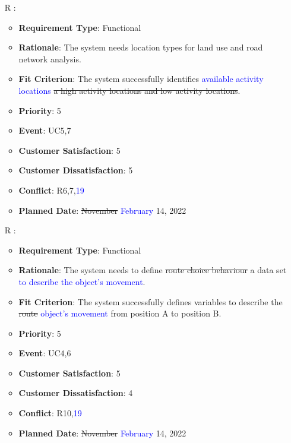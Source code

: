 \documentclass[12pt, titlepage]{article}
\newcounter{reqnum} %
\begin{document}
\begin{itemize}
\item[R\refstepcounter{reqnum}\thereqnum
\label{R_Inputs_1}:] 
\begin{itemize}
    \item \textbf{Requirement Type}: Functional
    \item \textbf{Rationale}: The system needs location types for land use and road network analysis.
    \item \textbf{Fit Criterion}: The system successfully identifies \textcolor{blue}{available activity locations} \sout{a high activity locations and low activity locations}. 
    \item \textbf{Priority}: 5
    \item \textbf{Event}: UC5,7
    \item \textbf{Customer Satisfaction}: 5
    \item \textbf{Customer Dissatisfaction}: 5
    \item \textbf{Conflict}: R6,7,\textcolor{blue}{19}
    \item \textbf{Planned Date}: \sout{November} \textcolor{blue}{February} 14, 2022
\end{itemize}

\item[R\refstepcounter{reqnum}\thereqnum
\label{R_Inputs_1}:] 
\begin{itemize}
    \item \textbf{Requirement Type}: Functional
    \item \textbf{Rationale}: The system needs to define \sout{route choice behaviour} a data set \textcolor{blue}{to describe the object's movement}.
    \item \textbf{Fit Criterion}: The system successfully defines variables to describe the \sout{route} \textcolor{blue}{object's movement} from position A to position B.
    \item \textbf{Priority}: 5
    \item \textbf{Event}: UC4,6
    \item \textbf{Customer Satisfaction}: 5
    \item \textbf{Customer Dissatisfaction}: 4
    \item \textbf{Conflict}: R10,\textcolor{blue}{19}
    \item \textbf{Planned Date}: \sout{November} \textcolor{blue}{February} 14, 2022
\end{itemize}



\end{itemize}
\end{document}
